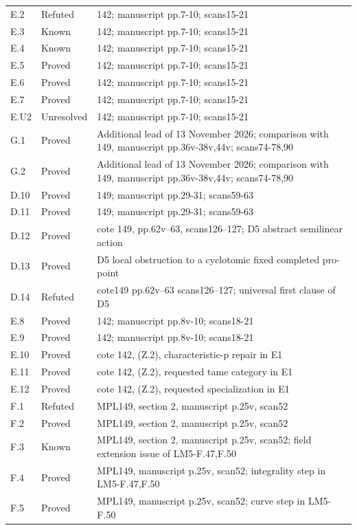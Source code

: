 {\begin{longtable}{p{1.9cm}p{1.7cm}p{10.3cm}}
E.2 & Refuted & 142; manuscript pp.7-10; scans15-21 \\
E.3 & Known & 142; manuscript pp.7-10; scans15-21 \\
E.4 & Known & 142; manuscript pp.7-10; scans15-21 \\
E.5 & Proved & 142; manuscript pp.7-10; scans15-21 \\
E.6 & Proved & 142; manuscript pp.7-10; scans15-21 \\
E.7 & Proved & 142; manuscript pp.7-10; scans15-21 \\
E.U2 & Unresolved & 142; manuscript pp.7-10; scans15-21 \\
G.1 & Proved & Additional lead of 13 November 2026; comparison with 149, manuscript pp.36v-38v,44v; scans74-78,90 \\
G.2 & Proved & Additional lead of 13 November 2026; comparison with 149, manuscript pp.36v-38v,44v; scans74-78,90 \\
D.10 & Proved & 149; manuscript pp.29-31; scans59-63 \\
D.11 & Proved & 149; manuscript pp.29-31; scans59-63 \\
D.12 & Proved & cote 149, pp.62v--63, scans126--127; D5 abstract semilinear action \\
D.13 & Proved & D5 local obstruction to a cyclotomic fixed completed pro-point \\
D.14 & Refuted & cote149 pp.62v--63 scans126--127; universal first clause of D5 \\
E.8 & Proved & 142; manuscript pp.8v-10; scans18-21 \\
E.9 & Proved & 142; manuscript pp.8v-10; scans18-21 \\
E.10 & Proved & cote 142, (Z.2), characteristic-p repair in E1 \\
E.11 & Proved & cote 142, (Z.2), requested tame category in E1 \\
E.12 & Proved & cote 142, (Z.2), requested specialization in E1 \\
F.1 & Refuted & MPL149, section 2, manuscript p.25v, scan52 \\
F.2 & Proved & MPL149, section 2, manuscript p.25v, scan52 \\
F.3 & Known & MPL149, section 2, manuscript p.25v, scan52; field extension issue of LM5-F.47,F.50 \\
F.4 & Proved & MPL149, manuscript p.25v, scan52; integrality step in LM5-F.47,F.50 \\
F.5 & Proved & MPL149, manuscript p.25v, scan52; curve step in LM5-F.50 \\

\end{longtable}}
